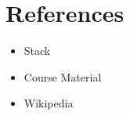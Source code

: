 \section{References}
\begin{itemize}
    \item Stack
    \item Course Material
    \item Wikipedia
\end{itemize}
\newpage
